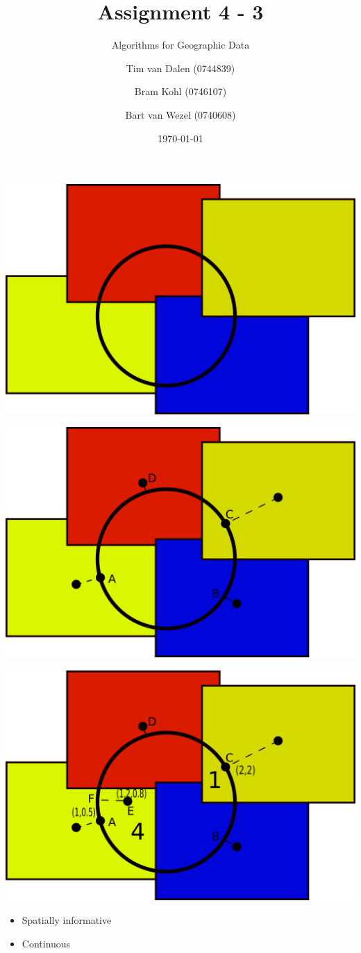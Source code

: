 \documentclass{beamer}
\title{Assignment 4 -  3}
\subtitle{Algorithms for Geographic Data}
\author[Group 10]{
	Tim van Dalen (0744839)
	\and
	Bram Kohl (0746107)
	\and
	Bart van Wezel (0740608)
}
\institute[TU/e] %
{
    WIS\\
	Eindhoven University of Technology
}
\date{\today}
\begin{document}
	\begin{frame}
		\titlepage
	\end{frame}
	
	\begin{frame}
		\centering
		\includegraphics[width=\textwidth]{necklace1}
	\end{frame}
	\begin{frame}
		\centering
		\includegraphics[width=\textwidth]{necklace2}
	\end{frame}
	\begin{frame}
		\centering
		\includegraphics[width=\textwidth]{necklace3}
	\end{frame}
	
	
	\begin{frame}
		\begin{itemize}
			\item Spatially informative
			\item Continuous
		\end{itemize}
	\end{frame}
	
	
\end{document}
